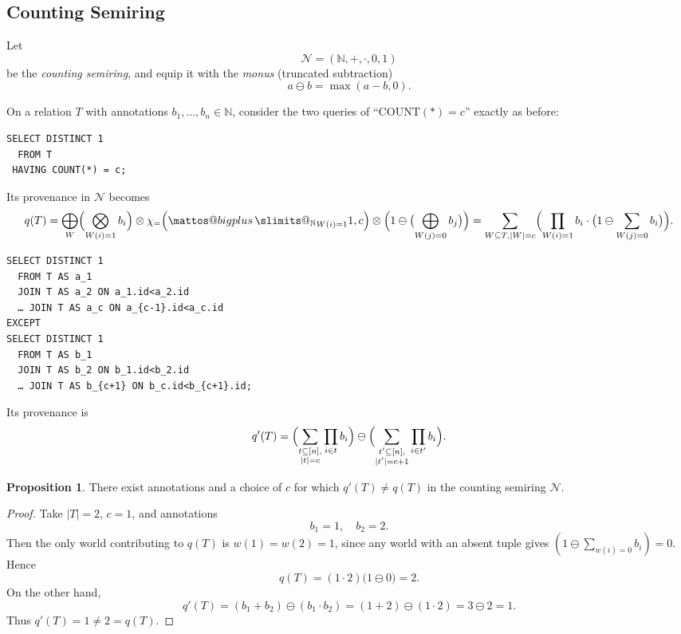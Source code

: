 \documentclass[10pt,a4paper]{scrartcl}
\makeatletter
\theoremstyle{definition}
\newtheorem{proposition}[theorem]{Proposition}
\theoremstyle{remark}
\newcommand{\bigplus}{%
  \DOTSB\mathop{\mathpalette\mattos@bigplus\relax}\slimits@
}
\newcommand\mattos@bigplus[2]{%
  \vcenter{\hbox{%
    \sbox\z@{$#1\sum$}%
    \resizebox{!}{0.9\dimexpr\ht\z@+\dp\z@}{\raisebox{\depth}{$\m@th#1+$}}%
  }}%
  \vphantom{\sum}%
}
\makeatother
\begin{document}
\subsection*{Counting Semiring}

Let
\[
  \mathcal{N} = (\mathbb{N},+,\cdot,0,1)
\]
be the \emph{counting semiring}, and equip it with the \emph{monus} (truncated subtraction)
\[
  a \ominus b =\max(a - b,0).
\]

On a relation \(T\) with annotations \(b_1,\dots,b_n\in\mathbb{N}\), consider the two queries of 
“\(\mathrm{COUNT}(*) = c\)” exactly as before:

\begin{verbatim}
SELECT DISTINCT 1
  FROM T
 HAVING COUNT(*) = c;
\end{verbatim}

Its provenance in \(\mathcal{N}\) becomes
\[
  q(T)
  =
  \bigoplus_{W}
    \Bigl(\bigotimes_{W(i)=1}b_i\Bigr)\otimes\chi_{=}\Bigl({\bigplus_{\mathbb{N}}}_{W(i)=1} 1, c\Bigr)\otimes\Bigl(1 \ominus \bigl(\bigoplus_{W(j) = 0}b_j\bigr)\Bigr)
  =
  \sum_{W\subseteq T, |W|=c}
    \Bigl(\prod_{W(i)=1}b_i\cdot\bigl(1\ominus\sum_{W(j)=0}b_i\bigr)\Bigr).
\]

\begin{verbatim}
SELECT DISTINCT 1
  FROM T AS a_1
  JOIN T AS a_2 ON a_1.id<a_2.id
  … JOIN T AS a_c ON a_{c-1}.id<a_c.id
EXCEPT
SELECT DISTINCT 1
  FROM T AS b_1
  JOIN T AS b_2 ON b_1.id<b_2.id
  … JOIN T AS b_{c+1} ON b_c.id<b_{c+1}.id;
\end{verbatim}

Its provenance is
\[
  q'(T)
  =
  \Bigl(\sum_{\substack{t\subseteq[n],\\|t|=c}}\prod_{i\in t}b_i\Bigr)
  \ominus
  \Bigl(\sum_{\substack{t'\subseteq[n],\\|t'|=c+1}}\prod_{i\in t'}b_i\Bigr).
\]

\begin{proposition}
There exist annotations and a choice of \(c\) for which
\(q'(T)\neq q(T)\)
in the counting semiring \(\mathcal{N}\).
\end{proposition}

\begin{proof}
Take \(\lvert T\rvert=2\), \(c=1\), and annotations
\[
  b_1 = 1,\quad b_2 = 2.
\]
Then the only world contributing to \(q(T)\) is \(w(1)=w(2)=1\), since any world with an absent tuple gives
\((1\ominus\sum_{w(i)=0}b_i)=0\).  Hence
\[
  q(T)
  = (1\cdot2)\bigl(1\ominus0\bigr)
  = 2.
\]
On the other hand,
\[
  q'(T)
  = (b_1+b_2)\ominus(b_1\cdot b_2)
  = (1+2)\ominus(1\cdot2)
  = 3\ominus2
  = 1.
\]
Thus \(q'(T)=1\neq2=q(T)\).
\end{proof}
\end{document}
